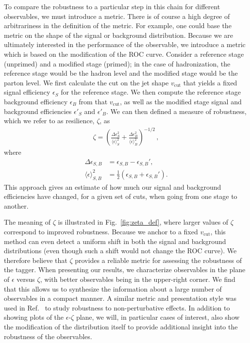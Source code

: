 \documentclass[11pt,letterpaper]{article}
\DeclareRobustCommand{\Fig}[1]{Fig.~\ref{#1}}
\DeclareRobustCommand{\Ref}[1]{Ref.~\cite{#1}}
\begin{document}
To compare the robustness to a
particular step in this chain for different observables, we must
introduce a metric.
%
There is of course a high degree of arbitrariness
in the definition of the metric.
%
For example, one could base the metric on the shape of the signal or background distribution.
%
Because we are ultimately interested in the performance of the observable, we introduce a metric which is based on the modification of the ROC curve.
%
Consider a reference stage (unprimed) and a modified stage (primed); in the case of hadronization, the reference stage would be the hadron level and the modified stage would be the parton level.
%
We first calculate the cut on the jet shape $v_{\text{cut}}$ that yields a fixed signal efficiency $\epsilon_S$ for the reference stage.
%
We then compute the reference stage background efficiency $\epsilon_B$ from that $v_{\text{cut}}$, as well as the modified stage signal and background efficiencies $\epsilon'_S$ and $\epsilon'_B$.
%
We can then defined a measure of robustness, which we refer to as resilience, $\zeta$, as
%
\begin{align}
\zeta=\left(  \frac{\Delta \epsilon_S^2}{ \langle \epsilon \rangle_S^2}  +\frac{\Delta \epsilon_B^2}{ \langle \epsilon \rangle_B^2}  \right)^{-1/2}\,,
\end{align}
%
where
%
\begin{align}
\Delta \epsilon_{S,B} & =\epsilon_{S,B}-\epsilon_{S,B}',\\
\langle \epsilon \rangle_{S,B}^2 & = \frac{1}{2} \left(\epsilon_{S,B} + \epsilon_{S,B}'\right).
\end{align}
%
This approach gives an estimate of how much our signal and background efficiencies have changed, for a given set of cuts, when going from one stage to another.

The meaning of $\zeta$ is illustrated in \Fig{fig:zeta_def}, where larger values of $\zeta$ correspond to improved robustness.
%
Because we anchor to a fixed $v_{\text{cut}}$, this method can even detect a uniform shift in both the signal and background distributions (even though such a shift would not change the ROC curve).
%
We therefore believe that $\zeta$ provides a reliable metric for assessing the robustness of the tagger.
%
When presenting our results, we characterize observables
in the plane of $\epsilon$ versus $\zeta$, with better observables being in
the upper-right corner.
%
We find that this allows us to synthesize the
information about a large number of observables in a compact manner.
%
A
similar metric and presentation style was used in \Ref{Salam:2016yht}
to study robustness to non-perturbative effects.
%
In addition to
showing plots of the $\epsilon$-$\zeta$ plane, we will, in particular
cases of interest, also show the modification of the distribution
itself to provide additional insight into the robustness of the
observables.
\end{document}
